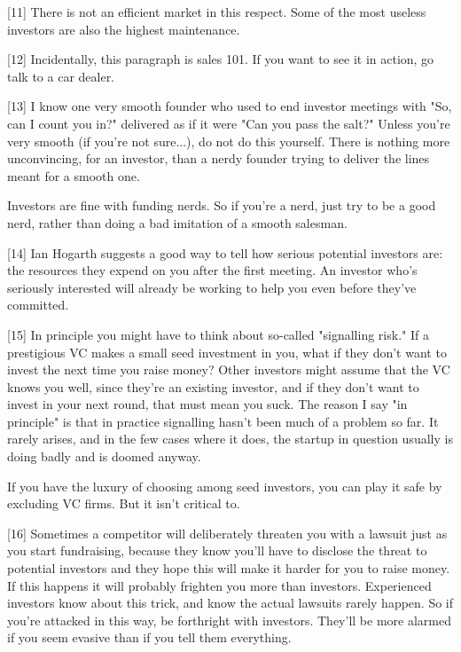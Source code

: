 [11] There is not an efficient market in this respect. Some of
                  the most useless investors are also the highest
                  maintenance.

[12] Incidentally, this paragraph is sales 101. If you want to
                  see it in action, go talk to a car dealer.

[13] I know one very smooth founder who used to end investor
                  meetings with "So, can I count you in?" delivered as if it
                  were "Can you pass the salt?" Unless you're very smooth (if
                  you're not sure...), do not do this yourself. There is nothing
                  more unconvincing, for an investor, than a nerdy founder
                  trying to deliver the lines meant for a smooth one.

Investors
                  are fine with funding nerds. So if you're a nerd, just try to
                  be a good nerd, rather than doing a bad imitation of a smooth
                  salesman.

[14] Ian Hogarth suggests a good way to tell how serious
                  potential investors are: the resources they expend on you
                  after the first meeting. An investor who's seriously
                  interested will already be working to help you even before
                  they've committed.

[15] In principle you might have to think about so-called
                  "signalling risk." If a prestigious VC makes a small seed
                  investment in you, what if they don't want to invest the next
                  time you raise money? Other investors might assume that the VC
                  knows you well, since they're an existing investor, and if
                  they don't want to invest in your next round, that must mean
                  you suck. The reason I say "in principle" is that in practice
                  signalling hasn't been much of a problem so far. It rarely
                  arises, and in the few cases where it does, the startup in
                  question usually is doing badly and is doomed anyway.

If
                  you have the luxury of choosing among seed investors, you can
                  play it safe by excluding VC firms. But it isn't critical
                  to.

[16] Sometimes a competitor will deliberately threaten you with
                  a lawsuit just as you start fundraising, because they know
                  you'll have to disclose the threat to potential investors and
                  they hope this will make it harder for you to raise money. If
                  this happens it will probably frighten you more than
                  investors. Experienced investors know about this trick, and
                  know the actual lawsuits rarely happen. So if you're attacked
                  in this way, be forthright with investors. They'll be more
                  alarmed if you seem evasive than if you tell them
                  everything.

